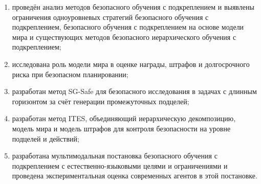 \begin{enumerate}
  \item проведён анализ методов безопасного обучения с подкреплением и выявлены ограничения одноуровневых стратегий безопасного обучения с подкреплением, безопасного обучения с подкреплением на основе модели мира и существующих методов безопасного иерархического обучения с подкреплением;
  \item исследована роль модели мира в оценке награды, штрафов и долгосрочного риска при безопасном планировании;
  \item разработан метод SG-Safe для безопасного исследования в задачах с длинным горизонтом за счёт генерации промежуточных подцелей;
  \item разработан метод ITES, объединяющий иерархическую декомпозицию, модель мира и модель штрафов для контроля безопасности на уровне подцелей и действий;
  \item разработана мультимодальная постановка безопасного обучения с подкреплением с естественно-языковыми целями и ограничениями и проведена экспериментальная оценка современных агентов в этой постановке.
\end{enumerate}
